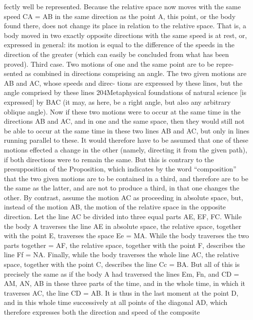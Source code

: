 fectly well be represented. Because the relative space now moves with the
same speed CA = AB in the same direction as the point A, this point, or
the body found there, does not change its place in relation to the relative
space. That is, a body moved in two exactly opposite directions with the
same speed is at rest, or, expressed in general: its motion is equal to the
difference of the speeds in the direction of the greater (which can easily
be concluded from what has been proved).
Third case. Two motions of one and the same point are to be repre-
sented as combined in directions comprising an angle.
The two given motions are AB and AC, whose speeds and direc-
tions are expressed by these lines, but the angle comprised by these lines
204Metaphysical foundations of natural science
[is expressed] by BAC (it may, as here, be a right angle, but also any
arbitrary oblique angle). Now if these two motions were to occur at the
same time in the directions AB and AC, and in one and the same space,
then they would still not be able to occur at the same time in these
two lines AB and AC, but only in lines running parallel to these. It would
therefore have to be assumed that one of these motions effected a change
in the other (namely, directing it from the given path), if both directions
were to remain the same. But this is contrary to the presupposition of
the Proposition, which indicates by the word “composition” that the two
given motions are to be contained in a third, and therefore are to be the
same as the latter, and are not to produce a third, in that one changes the
other.
By contrast, assume the motion AC as proceeding in absolute space,
but, instead of the motion AB, the motion of the relative space in the
opposite direction. Let the line AC be divided into three equal parts AE,
EF, FC. While the body A traverses the line AE in absolute space, the
relative space, together with the point E, traverses the space Ee = MA.
While the body traverses the two parts together = AF, the relative space,
together with the point F, describes the line Ff = NA. Finally, while the
body traverses the whole line AC, the relative space, together with the
point C, describes the line Cc = BA. But all of this is precisely the same
as if the body A had traversed the lines Em, Fn, and CD = AM, AN,
AB in these three parts of the time, and in the whole time, in which it
traverses AC, the line CD = AB. It is thus in the last moment at the point
D, and in this whole time successively at all points of the diagonal AD,
which therefore expresses both the direction and speed of the composite
